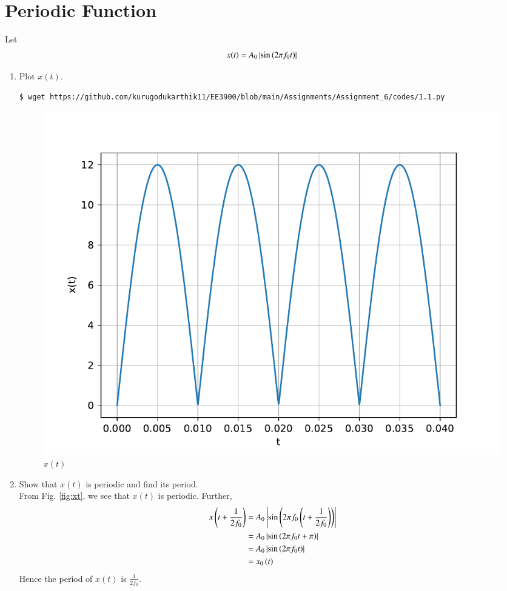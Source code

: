 \documentclass[journal,12pt,twocolumn]{IEEEtran}
\renewcommand\thesection{\arabic{section}}
\begin{document}
\section{Periodic Function}
Let
\begin{align}
x(t) &= A_0\left\vert\sin\left(2\pi f_0 t\right)\right\vert
\label{eq:10-orig-diff-def}
\end{align}
\begin{enumerate}[label=\thesection.\arabic*
,ref=\thesection.\theenumi]
\item Plot $x(t)$.
\\
\solution
\begin{lstlisting}
$ wget https://github.com/kurugodukarthik11/EE3900/blob/main/Assignments/Assignment_6/codes/1.1.py
\end{lstlisting}
\begin{figure}[!ht]
\includegraphics[width=\columnwidth]{figs/1.1.pdf}
\caption{$x(t)$}
\label{fig:xt}
\end{figure}
\item Show that $x(t)$ is periodic and find its period. \\
\solution From Fig. \eqref{fig:xt}, we see that $x(t)$ is periodic. Further,
\begin{align}
x\left(t+\frac{1}{2f_0}\right) &= A_0\left\vert\sin\left(2\pi f_0\left(t + \frac{1}{2f_0}\right)\right)\right\vert \\
&= A_0\left\vert\sin\left(2\pi f_0t + \pi\right)\right\vert \\
&= A_0\left\vert\sin\left(2\pi f_0t\right)\right\vert \\
&= x_0\left(t\right)
\end{align}
Hence the period of $x(t)$ is $\frac{1}{2f_0}$.
\end{enumerate}
\end{document}
